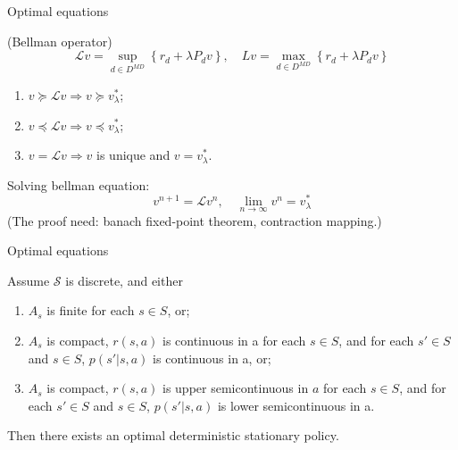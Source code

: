 \documentclass{beamer}
\begin{document}
\begin{frame}[t]{Optimal equations}
    \begin{definition}
        (Bellman operator)
        \[
            \mathcal{L} v = \sup_{d \in D^{MD}} \left\{ r_d + \lambda P_d v \right\}, \quad
            L v = \max_{d \in D^{MD}} \left\{ r_d + \lambda P_d v \right\}
        \]
    \end{definition}
    \begin{theorem}
        \begin{enumerate}
            \item $ v \succeq \mathcal{L} v \Rightarrow v \succeq v^*_\lambda $;
            \item $ v \preceq \mathcal{L} v \Rightarrow v \preceq v^*_\lambda$;
            \item $ v = \mathcal{L} v \Rightarrow v $ is unique and $ v = v^*_\lambda $.
        \end{enumerate}
    \end{theorem}

    Solving bellman equation:
    \[
        v^{n+1} = \mathcal{L}v^{n}, \quad \lim_{n \to \infty} v^n = v^*_{\lambda}
    \]
    (The proof need: banach fixed-point theorem, contraction mapping.)
\end{frame}

\begin{frame}[t]{Optimal equations}
    \begin{theorem}
        Assume $ \mathcal{S} $ is discrete, and either
        \begin{enumerate}
            \item $ A_s $ is finite for each $ s \in S $, or;
            \item $ A_s $ is compact, $ r(s,a) $ is continuous in a for each $ s \in S $, and for each $ s' \in S $ and $ s \in S $, $ p(s' | s, a) $ is continuous in a, or;
            \item $ A_s $ is compact, $ r(s, a) $ is upper semicontinuous in $ a $ for each $ s \in S $, and for each $ s' \in S $ and $ s \in S $, $ p(s' | s, a) $ is lower semicontinuous in a.
        \end{enumerate}
        Then there exists an optimal deterministic stationary policy.
    \end{theorem}
\end{frame}
\end{document}
